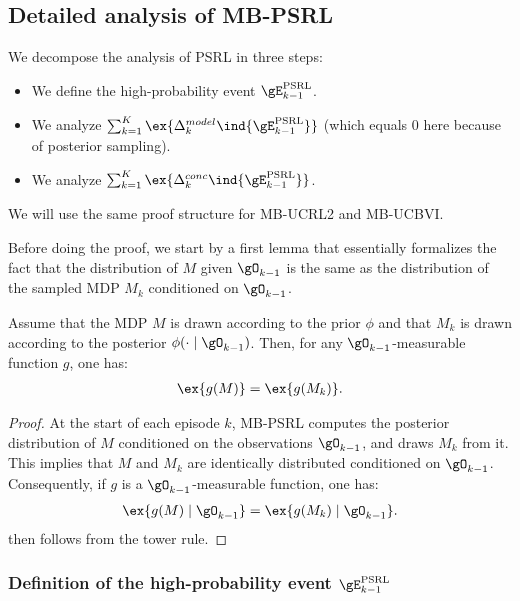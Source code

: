 \subsection{Detailed analysis of MB-PSRL}
\label{ssec:proof_PSRL}

We decompose the analysis of PSRL in three steps: 
\begin{itemize}
    \item We define the high-probability event $\gE^\text{PSRL}_{k-1}$.
    \item We analyze $\sum_{k=1}^K\ex{\Delta^{model}_k \ind{\gE^\text{PSRL}_{k-1}}}$ (which equals $0$ here because of posterior sampling).
    \item We analyze $\sum_{k=1}^K\ex{\Delta^{conc}_k \ind{\gE^\text{PSRL}_{k-1}}}$. 
\end{itemize}
We will use the same proof structure for MB-UCRL2 and MB-UCBVI. 

Before doing the proof, we start by a first lemma that essentially formalizes the fact that the distribution of $M$ given $\gO_{k-1}$ is the same as the distribution of the sampled MDP $M_{k}$ conditioned on $\gO_{k-1}$. 
\begin{lem}
    \label{lem:bayesian}
    Assume that the MDP $M$ is drawn according to the prior $\phi$ and that $M_k$ is drawn according to the posterior $\phi(\cdot \mid \gO_{k-1})$. Then, for any $\gO_{k-1}$-measurable function $g$, one has:
    \begin{align}
        \label{eq:lem_bayesian}
        \ex{g(M)} = \ex{g(M_k)}. 
    \end{align}
\end{lem}
\begin{proof}
    At the start of each episode $k$, MB-PSRL computes the posterior distribution of $M$ conditioned on the observations $\gO_{k-1}$, and draws $M_k$ from it. This implies that $M$ and $M_k$ are identically distributed conditioned on $\gO_{k-1}$. Consequently, if $g$ is a $\gO_{k-1}$-measurable function, one has:
    \begin{align*}
        \ex{g(M) \mid \gO_{k-1}} = \ex{g(M_k) \mid \gO_{k-1}}. 
    \end{align*}
     then follows from the tower rule. 
\end{proof}

\subsubsection{Definition of the high-probability event $\gE^\text{PSRL}_{k-1}$}

